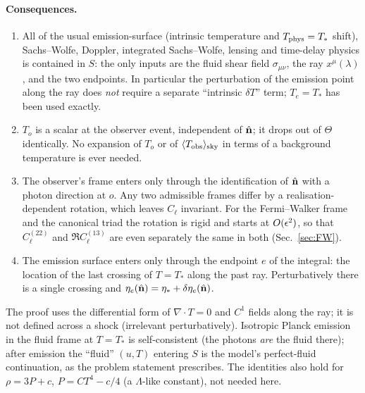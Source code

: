 \paragraph{Consequences.}
\begin{enumerate}
\item[(i)] All of the usual emission-surface (intrinsic temperature and $T_{\rm phys}=T_*$ shift),
Sachs--Wolfe, Doppler, integrated Sachs--Wolfe, lensing and time-delay physics is contained in $S$: the
only inputs are the fluid shear field $\sigma_{\mu\nu}$, the ray $x^\mu(\lambda)$, and the two endpoints.
In particular the perturbation of the emission point along the ray does \emph{not} require a separate
``intrinsic $\delta T$'' term; $T_e=T_*$ has been used exactly.
\item[(ii)] $T_o$ is a scalar at the observer event, independent of $\hat{\mathbf n}$; it drops out of $\Theta$
identically.  No expansion of $T_o$ or of $\langle T_{\rm obs}\rangle_{\rm sky}$ in terms of a background temperature is ever needed.
\item[(iii)] The observer's frame enters only through the identification of $\hat{\mathbf n}$ with a photon direction at $o$.  Any two
admissible frames differ by a realisation-dependent rotation, which leaves $C_\ell$ invariant.  For the Fermi--Walker frame and the canonical triad
the rotation is rigid and starts at $O(\epsilon^2)$, so that $C^{(22)}_\ell$ and $\Re C^{(13)}_\ell$ are even separately the same in both (Sec.~\ref{sec:FW}).
\item[(iv)] The emission surface enters only through the endpoint $e$ of the integral: the location of the
last crossing of $T=T_*$ along the past ray.  Perturbatively there is a single crossing and
$\eta_e(\hat{\mathbf n})=\eta_*+\delta\eta_e(\hat{\mathbf n})$.
\end{enumerate}
\begin{remark}[validity]
The proof uses the differential form of $\nabla\cdot T=0$ and $C^1$ fields along the ray; it is not
defined across a shock (irrelevant perturbatively).  Isotropic Planck emission in the fluid frame at $T=T_*$
is self-consistent (the photons \emph{are} the fluid there); after emission the ``fluid'' $(u,T)$ entering $S$
is the model's perfect-fluid continuation, as the problem statement prescribes.  The identities also hold
for $\rho=3P+c$, $P=CT^4-c/4$ (a $\Lambda$-like constant), not needed here.
\end{remark}

